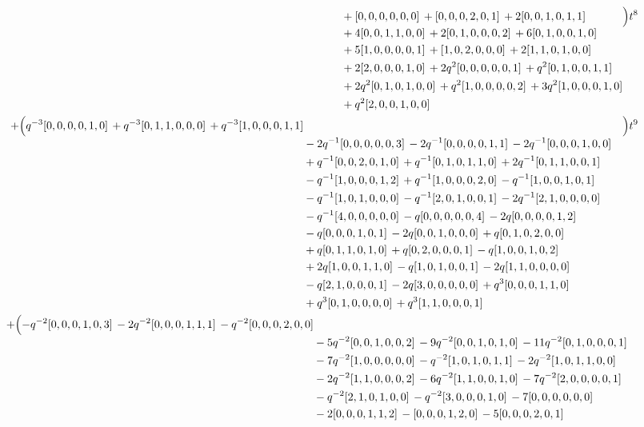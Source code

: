 \documentclass[10pt]{article}
\begin{document}
\[\begin{aligned}
\begin{aligned}[t]
  &{}+[0,0,0,0,0,0]\,+[0,0,0,2,0,1]\,+2[0,0,1,0,1,1] \\
  &{}+4[0,0,1,1,0,0]\,+2[0,1,0,0,0,2]\,+6[0,1,0,0,1,0] \\
  &{}+5[1,0,0,0,0,1]\,+[1,0,2,0,0,0]\,+2[1,1,0,1,0,0] \\
  &{}+2[2,0,0,0,1,0]\,+2q^{2}[0,0,0,0,0,1]\,+q^{2}[0,1,0,0,1,1] \\
  &{}+2q^{2}[0,1,0,1,0,0]\,+q^{2}[1,0,0,0,0,2]\,+3q^{2}[1,0,0,0,1,0] \\
  &{}+q^{2}[2,0,0,1,0,0]\end{aligned}\Bigr)t^{8} \\
  + \Bigl(\begin{aligned}[t]q^{-3}[0,0,0,0,1,0]\,+q^{-3}[0,1,1,0,0,0]\,+q^{-3}[1,0,0,0,1,1] \\
  &{}-2q^{-1}[0,0,0,0,0,3]\,-2q^{-1}[0,0,0,0,1,1]\,-2q^{-1}[0,0,0,1,0,0] \\
  &{}+q^{-1}[0,0,2,0,1,0]\,+q^{-1}[0,1,0,1,1,0]\,+2q^{-1}[0,1,1,0,0,1] \\
  &{}-q^{-1}[1,0,0,0,1,2]\,+q^{-1}[1,0,0,0,2,0]\,-q^{-1}[1,0,0,1,0,1] \\
  &{}-q^{-1}[1,0,1,0,0,0]\,-q^{-1}[2,0,1,0,0,1]\,-2q^{-1}[2,1,0,0,0,0] \\
  &{}-q^{-1}[4,0,0,0,0,0]\,-q[0,0,0,0,0,4]\,-2q[0,0,0,0,1,2] \\
  &{}-q[0,0,0,1,0,1]\,-2q[0,0,1,0,0,0]\,+q[0,1,0,2,0,0] \\
  &{}+q[0,1,1,0,1,0]\,+q[0,2,0,0,0,1]\,-q[1,0,0,1,0,2] \\
  &{}+2q[1,0,0,1,1,0]\,-q[1,0,1,0,0,1]\,-2q[1,1,0,0,0,0] \\
  &{}-q[2,1,0,0,0,1]\,-2q[3,0,0,0,0,0]\,+q^{3}[0,0,0,1,1,0] \\
  &{}+q^{3}[0,1,0,0,0,0]\,+q^{3}[1,1,0,0,0,1]\end{aligned}\Bigr)t^{9} \\
  + \Bigl(\begin{aligned}[t]-q^{-2}[0,0,0,1,0,3]\,-2q^{-2}[0,0,0,1,1,1]\,-q^{-2}[0,0,0,2,0,0] \\
  &{}-5q^{-2}[0,0,1,0,0,2]\,-9q^{-2}[0,0,1,0,1,0]\,-11q^{-2}[0,1,0,0,0,1] \\
  &{}-7q^{-2}[1,0,0,0,0,0]\,-q^{-2}[1,0,1,0,1,1]\,-2q^{-2}[1,0,1,1,0,0] \\
  &{}-2q^{-2}[1,1,0,0,0,2]\,-6q^{-2}[1,1,0,0,1,0]\,-7q^{-2}[2,0,0,0,0,1] \\
  &{}-q^{-2}[2,1,0,1,0,0]\,-q^{-2}[3,0,0,0,1,0]\,-7[0,0,0,0,0,0] \\
  &{}-2[0,0,0,1,1,2]\,-[0,0,0,1,2,0]\,-5[0,0,0,2,0,1] \\

\end{aligned}
\end{aligned}\]
\end{document}
